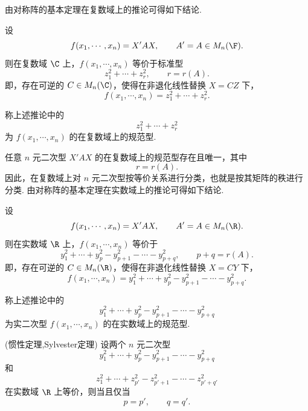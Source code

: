 由对称阵的基本定理在复数域上的推论可得如下结论.

\begin{corollary}
	设
	\[
	f(x_1,\cdots,x_n)=X'AX,
	\qquad A'=A\in M_n(\F).
	\]
	则在复数域 $\C$ 上，$f(x_1,\cdots,x_n)$ 等价于标准型
	\[
	z_1^2+\cdots+z_r^2,
	\qquad r=r(A).
	\]
	即，存在可逆的 $C\in M_n(\C)$，使得在非退化线性替换 $X=CZ$ 下，
	\[
	f(x_1,\cdots,x_n)=z_1^2+\cdots+z_r^2.
	\]
\end{corollary}

\begin{definition}\label{p1:concept:c7-l1425}
	称上述推论中的
	\[
	z_1^2+\cdots+z_r^2
	\]
	为 $f(x_1,\cdots,x_n)$ 的在复数域上的规范型.
\end{definition}任意 $n$ 元二次型 $X'AX$ 的在复数域上的规范型存在且唯一，其中\[r=r(A).\]因此，在复数域上对 $n$ 元二次型按等价关系进行分类，也就是按其矩阵的秩进行分类.
由对称阵的基本定理在实数域上的推论可得如下结论.

\begin{corollary}
	设
	\[
	f(x_1,\cdots,x_n)=X'AX,
	\qquad A'=A\in M_n(\R).
	\]
	则在实数域 $\R$ 上，$f(x_1,\cdots,x_n)$ 等价于
	\[
	y_1^2+\cdots+y_p^2-y_{p+1}^2-\cdots-y_{p+q}^2,
	\qquad p+q=r(A).
	\]
	即，存在可逆的 $C\in M_n(\R)$，使得在非退化线性替换 $X=CY$ 下，
	\[
	f(x_1,\cdots,x_n)=y_1^2+\cdots+y_p^2-y_{p+1}^2-\cdots-y_{p+q}^2.
	\]
\end{corollary}

\begin{definition}\label{p1:concept:c7-l1451}
	称上述推论中的
	\[
	y_1^2+\cdots+y_p^2-y_{p+1}^2-\cdots-y_{p+q}^2
	\]
	为实二次型 $f(x_1,\cdots,x_n)$ 的在实数域上的规范型.
\end{definition}



\begin{theorem}(惯性定理,Sylvester定理)
	设两个 $n$ 元二次型
	\[
	y_1^2+\cdots+y_p^2-y_{p+1}^2-\cdots-y_{p+q}^2
	\]
	和
	\[
	z_1^2+\cdots+z_{p'}^2-z_{p'+1}^2-\cdots-z_{p'+q'}^2
	\]
	在实数域 $\R$ 上等价，则当且仅当
	\[
	p=p',\qquad q=q'.
	\]
\end{theorem}

